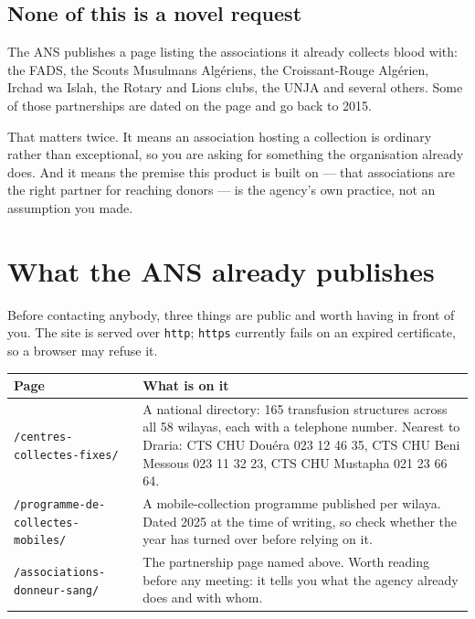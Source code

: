 \documentclass[11pt,a4paper]{article}
\begin{document}
\subsection{None of this is a novel request}

The ANS publishes a page listing the associations it already collects blood
with: the FADS, the Scouts Musulmans Alg\'eriens, the Croissant-Rouge Alg\'erien,
Irchad wa Islah, the Rotary and Lions clubs, the UNJA and several others. Some
of those partnerships are dated on the page and go back to 2015.

That matters twice. It means an association hosting a collection is ordinary
rather than exceptional, so you are asking for something the organisation
already does. And it means the premise this product is built on --- that
associations are the right partner for reaching donors --- is the agency's own
practice, not an assumption you made.

\section{What the ANS already publishes}

Before contacting anybody, three things are public and worth having in front of
you. The site is served over \texttt{http}; \texttt{https} currently fails on an
expired certificate, so a browser may refuse it.

\begin{center}
\begin{tabularx}{\textwidth}{@{}lX@{}}
\toprule
\textbf{Page} & \textbf{What is on it} \\
\midrule
\texttt{/centres-collectes-fixes/} &
A national directory: 165 transfusion structures across all 58 wilayas, each
with a telephone number. Nearest to Draria: CTS CHU Dou\'era 023 12 46 35, CTS
CHU Beni Messous 023 11 32 23, CTS CHU Mustapha 021 23 66 64. \\
\texttt{/programme-de-collectes-mobiles/} &
A mobile-collection programme published per wilaya. Dated 2025 at the time of
writing, so check whether the year has turned over before relying on it. \\
\texttt{/associations-donneur-sang/} &
The partnership page named above. Worth reading before any meeting: it tells
you what the agency already does and with whom. \\
\bottomrule
\end{tabularx}
\end{center}
\end{document}
